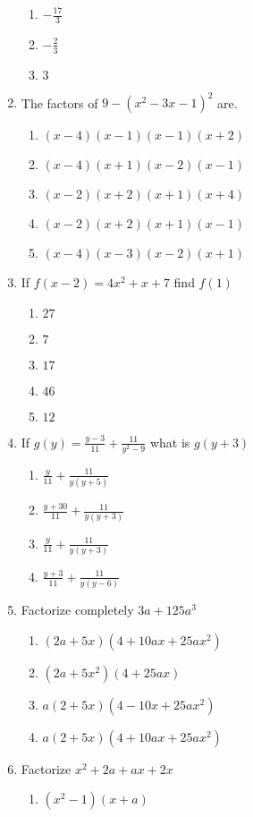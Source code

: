 \begin{multicols}{2}
\begin{enumerate}[label={\arabic*.}]
\begin{enumerate}[label={\Alph*.}]
	\item \(-\frac{17}{3}\)
	\item \(-\frac{2}{3}\)
	\item \(3\)
	\end{enumerate}
\item The factors of \(9-(x^2-3x-1)^2\) are. 
	\begin{enumerate}[label={\Alph*.}]
	\item \((x-4)(x-1)(x-1)(x+2)\)
	\item \((x-4)(x+1)(x-2)(x-1)\)
	\item \((x-2)(x+2)(x+1)(x+4)\)
	\item \((x-2)(x+2)(x+1)(x-1)\)
	\item \((x-4)(x-3)(x-2)(x+1)\)
	\end{enumerate}
\item If \(f(x-2) = 4x^2 + x + 7 \) find \(f(1)\)
	\begin{enumerate}[label={\Alph*.}]
	\item \(27\)
	\item \(7\)
	\item \(17\)
	\item \(46\)
	\item \(12\)
	\end{enumerate}
\item If \(g(y) = \frac{y - 3}{11} + \frac{11}{y^2-9}\) what is \(g(y+3)\)
	\begin{enumerate}[label={\Alph*.}]
	\item \(\frac{y}{11} + \frac{11}{y(y+5)}\)
	\item \(\frac{y+30}{11} + \frac{11}{y(y+3)}\)
	\item \(\frac{y}{11} + \frac{11}{y(y+3)}\)
	\item \(\frac{y+3}{11}+\frac{11}{y(y-6)}\)
	\end{enumerate}
\item Factorize completely \(3a+125a^3\)
	\begin{enumerate}[label={\Alph*.}]
	\item \((2a+5x)(4+10ax + 25ax^2)\)
	\item \((2a+5x^2)(4+25ax)\)
	\item \(a(2+5x)(4-10x+25ax^2)\)
	\item \(a(2+5x)(4+10ax+25ax^2)\)
	\end{enumerate}
\item Factorize \(x^2+2a+ax+2x\)
	\begin{enumerate}[label={\Alph*.}]
	\item \((x^2-1)(x+a)\)

\end{enumerate}
\end{enumerate}
\end{multicols}

